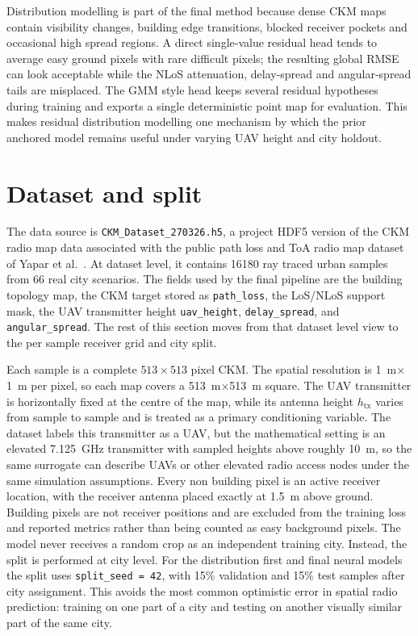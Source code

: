 Distribution modelling is part of the final method because dense CKM maps
contain visibility changes, building edge transitions, blocked receiver pockets
and occasional high spread regions. A direct single-value residual head tends to
average easy ground pixels with rare difficult pixels; the resulting global RMSE
can look acceptable while the NLoS attenuation, delay-spread and angular-spread
tails are misplaced. The GMM style head keeps several residual hypotheses during
training and exports a single deterministic point map for evaluation. This makes
residual distribution modelling one mechanism by which the prior anchored model
remains useful under varying UAV height and city holdout.

\section{Dataset and split}
\label{sec:methodology_dataset_split}
The data source is \texttt{CKM\_Dataset\_270326.h5}, a project HDF5 version of
the CKM radio map data associated with the public path loss and ToA radio map
dataset of Yapar et al.~\cite{dataset2212}. At dataset level, it contains
16180 ray traced urban samples from 66 real city scenarios. The fields used by
the final pipeline are the building topology map, the CKM target stored as
\texttt{path\_loss}, the LoS/NLoS support mask, the UAV transmitter height
\texttt{uav\_height}, \texttt{delay\_spread}, and
\texttt{angular\_spread}. The rest of this section moves from that dataset
level view to the per sample receiver grid and city split.

Each sample is a complete $513\times513$ pixel CKM. The spatial resolution is
\SI{1}{m}\(\times\)\SI{1}{m} per pixel, so each map covers a
\SI{513}{m}\(\times\)\SI{513}{m} square. The UAV transmitter is horizontally
fixed at the centre of the map, while its antenna height \(h_{\mathrm{tx}}\)
varies from sample to sample and is treated as a primary conditioning variable.
The dataset labels this transmitter as a UAV, but the mathematical setting is
an elevated \SI{7.125}{GHz} transmitter with sampled heights above roughly
\SI{10}{m}, so the same surrogate can describe UAVs or other elevated radio
access nodes under the same simulation assumptions.
Every non building pixel is an active receiver location, with the receiver antenna placed exactly at
\SI{1.5}{m} above ground. Building pixels are not receiver positions and are
excluded from the training loss and reported metrics rather than being counted
as easy background pixels. The model never receives a random crop as an
independent training city. Instead, the split is performed at city level. For
the distribution first and final neural models the split uses
\texttt{split\_seed = 42}, with 15\% validation and 15\% test samples after
city assignment. This avoids the most common optimistic error in spatial radio
prediction: training on one part of a city and testing on another visually
similar part of the same city.


